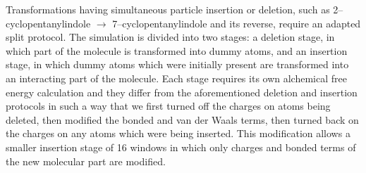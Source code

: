 \documentclass[journal=jctcce,manuscript=article]{achemso}
\begin{document}
Transformations having simultaneous particle insertion or deletion, such as 
2--cyclopentanylindole $\rightarrow$ 7--cyclopentanylindole and its reverse, require 
an adapted split protocol. The simulation is divided into two stages: a deletion stage, 
in which part of the molecule is transformed into dummy atoms, and an insertion stage, 
in which dummy atoms which were initially present are transformed into an 
interacting part of the molecule. Each stage requires its own alchemical free energy calculation and
they differ from the aforementioned deletion and insertion protocols in such a way
that we first turned off the charges on atoms being deleted, then modified the bonded 
and van der Waals terms, then turned back on the charges on any atoms which were 
being inserted. This modification allows a smaller insertion stage of 16 windows 
in which only charges and bonded terms of the new molecular part are modified.

\end{document}
